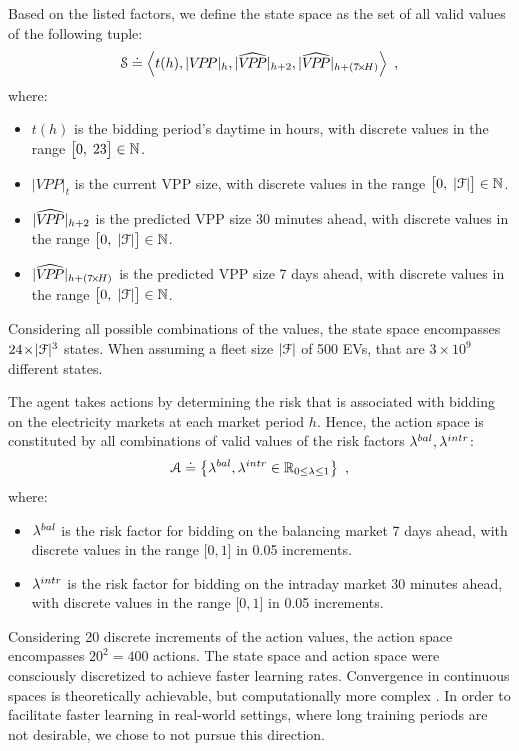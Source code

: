 \documentclass[a4paper, 12pt]{article}
\let\cite\shortcite
\begin{document}
Based on the listed factors, we define the state space as the set of all
valid values of the following tuple:
\begin{equation}
    \S \defeq \left\langle t(h), \vpp{h}, \vpphat{h+2}, \vpphat{h+(7\!\times\!H)}\right\rangle \text{ ,}
\end{equation}
where:
\begin{itemize}
\item \(t(h)\) is the bidding period's daytime in hours, with discrete values in the range
\(\big[0,\;23\big]\in\mathbb{N}\).
\item \(|VPP|_t\) is the current VPP size, with discrete values in the range
\(\big[0,\;|{\cal{F}}|\big] \in \mathbb{N}\).
\item \({|\widehat{V\!P\!P}|_{h+2}}\) is the predicted VPP size 30 minutes ahead, with discrete values in the range
\(\big[0,\;|{\cal{F}}|\big] \in \mathbb{N}\).
\item \({|\widehat{V\!P\!P}|_{h+(7\!\times\!H)}}\) is the predicted VPP size 7 days ahead, with discrete
values in the range \(\big[0,\;|{\cal{F}}|\big] \in \mathbb{N}\).
\end{itemize}
Considering all possible combinations of the values, the state space encompasses
\(24\!\times\!|{\cal{F}}|^3\) states. When assuming a fleet size \(|{\cal{F}}|\) of 500 EVs, that
are \(3\!\times\!10^9\) different states.

The agent takes actions by determining the risk that is associated with bidding
on the electricity markets at each market period \(h\). Hence, the action space is
constituted by all combinations of valid values of the risk factors
\(\lambda^{bal}_{},\lambda^{intr}_{}\):
\begin{equation}
    {\cal A} \doteq \left\{\lambda^{bal}_{},\lambda^{intr}_{} \in \mathbb{R}_{0 \leq \lambda \leq 1} \right\} \text{ ,}
\end{equation}
where:
\begin{itemize}
\item \(\lambda^{bal}_{}\) is the risk factor for bidding on the balancing market 7 days ahead,
with discrete values in the range \(\big[0,1\big]\) in 0.05 increments.
\item \(\lambda^{intr}_{}\) is the risk factor for bidding on the intraday market 30 minutes
ahead, with discrete values in the range \(\big[0,1\big]\) in 0.05 increments.
\end{itemize}
Considering 20 discrete increments of the action values, the action space
encompasses \(20^2 = 400\) actions. The state space and action space were
consciously discretized to achieve faster learning rates. Convergence in
continuous spaces is theoretically achievable, but computationally more complex
\cite{sutton18_reinf}. In order to facilitate faster learning in real-world
settings, where long training periods are not desirable, we chose to not pursue
this direction.
\end{document}
